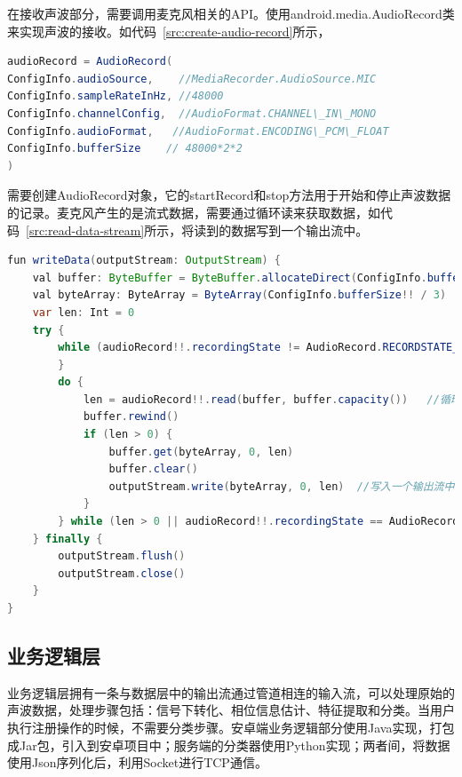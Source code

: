 在接收声波部分，需要调用麦克风相关的API。使用android.media.AudioRecord类来实现声波的接收。如代码~\ref{src:create-audio-record}所示，
\begin{lstlisting}[language={Java}, caption={创建AudioRecord对象 \label{src:create-audio-record}} ]
audioRecord = AudioRecord(
ConfigInfo.audioSource,    //MediaRecorder.AudioSource.MIC
ConfigInfo.sampleRateInHz, //48000
ConfigInfo.channelConfig,  //AudioFormat.CHANNEL\_IN\_MONO
ConfigInfo.audioFormat,   //AudioFormat.ENCODING\_PCM\_FLOAT
ConfigInfo.bufferSize    // 48000*2*2
)
\end{lstlisting}


需要创建AudioRecord对象，它的startRecord和stop方法用于开始和停止声波数据的记录。麦克风产生的是流式数据，需要通过循环读来获取数据，如代码~\ref{src:read-data-stream}所示，将读到的数据写到一个输出流中。

\begin{lstlisting}[language={Java}, caption={读取数据流 \label{src:read-data-stream}} ]
fun writeData(outputStream: OutputStream) {
    val buffer: ByteBuffer = ByteBuffer.allocateDirect(ConfigInfo.bufferSize!! / 3) //创建Direct内存缓存区
    val byteArray: ByteArray = ByteArray(ConfigInfo.bufferSize!! / 3)   //创建缓存数组
    var len: Int = 0
    try {
        while (audioRecord!!.recordingState != AudioRecord.RECORDSTATE_RECORDING) {
        }
        do {
            len = audioRecord!!.read(buffer, buffer.capacity())   //循环读取数据流
            buffer.rewind()
            if (len > 0) {
                buffer.get(byteArray, 0, len)
                buffer.clear()
                outputStream.write(byteArray, 0, len)  //写入一个输出流中
            }
        } while (len > 0 || audioRecord!!.recordingState == AudioRecord.RECORDSTATE_RECORDING)
    } finally {
        outputStream.flush()
        outputStream.close()
    }
}
\end{lstlisting}


\subsection{业务逻辑层}
业务逻辑层拥有一条与数据层中的输出流通过管道相连的输入流，可以处理原始的声波数据，处理步骤包括：信号下转化、相位信息估计、特征提取和分类。当用户执行注册操作的时候，不需要分类步骤。安卓端业务逻辑部分使用Java实现，打包成Jar包，引入到安卓项目中；服务端的分类器使用Python实现；两者间，将数据使用Json序列化后，利用Socket进行TCP通信。

